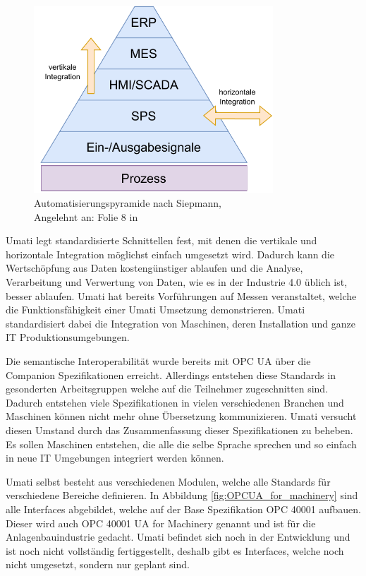 \documentclass[a4paper, 12pt, oneside, toc=listofnumbered, bibliography=totoc]{scrbook}
\begin{document}
		\begin{figure}[H]
			\centering
			\includegraphics[width=0.8\textwidth]{res/diagramms/Automatisierungspyramide.pdf}
			\caption{Automatisierungspyramide nach Siepmann, \\ Angelehnt an: Folie 8 in \cite{mielebacher_verteilte_2021}} 
			\label{fig:Automatisierungspyramide}
		\end{figure}
		
		\ac{Umati} legt standardisierte Schnittellen fest, mit denen die vertikale und horizontale Integration möglichst einfach umgesetzt wird. Dadurch kann die Wertschöpfung aus Daten kostengünstiger ablaufen und die Analyse, Verarbeitung und Verwertung von Daten, wie es in der Industrie 4.0 üblich ist, besser ablaufen. \ac{Umati} hat bereits Vorführungen auf Messen veranstaltet, welche die Funktionsfähigkeit einer \ac{Umati} Umsetzung demonstrieren. \ac{Umati} standardisiert dabei die Integration von Maschinen, deren Installation und ganze IT Produktionsumgebungen. \cite{noauthor_about_nodate}
		
		Die semantische Interoperabilität wurde bereits mit OPC UA über die Companion Spezifikationen erreicht. Allerdings entstehen diese Standards in gesonderten Arbeitsgruppen welche auf die Teilnehmer zugeschnitten sind. Dadurch entstehen viele Spezifikationen in vielen verschiedenen Branchen und Maschinen können nicht mehr ohne Übersetzung kommunizieren. \ac{Umati} versucht diesen Umstand durch das Zusammenfassung dieser Spezifikationen zu beheben. Es sollen Maschinen entstehen, die alle die selbe Sprache sprechen und so einfach in neue IT Umgebungen integriert werden können.
		
		\ac{Umati} selbst besteht aus verschiedenen Modulen, welche alle Standards für verschiedene Bereiche definieren. In Abbildung \ref{fig:OPCUA_for_machinery} sind alle Interfaces abgebildet, welche auf der Base Spezifikation OPC 40001 aufbauen. Dieser wird auch OPC 40001 UA for Machinery genannt und ist für die Anlagenbauindustrie gedacht. \ac{Umati} befindet sich noch in der Entwicklung und ist noch nicht vollständig fertiggestellt, deshalb gibt es Interfaces, welche noch nicht umgesetzt, sondern nur geplant sind. \cite{noauthor_machinery_nodate}
		
\end{document}
